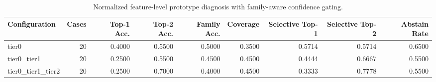 \begin{table}[t]
\centering
\caption{Normalized feature-level prototype diagnosis with family-aware confidence gating.}
\label{tab:dice_stressor_hierarchical_diagnosis}
\footnotesize
\begin{tabular}{lrrrrrrrr}
\toprule
Configuration & Cases & Top-1 Acc. & Top-2 Acc. & Family Acc. & Coverage & Selective Top-1 & Selective Top-2 & Abstain Rate \\
\midrule
tier0 & 20 & 0.4000 & 0.5500 & 0.5000 & 0.3500 & 0.5714 & 0.5714 & 0.6500 \\
tier0_tier1 & 20 & 0.2500 & 0.5500 & 0.4500 & 0.4500 & 0.4444 & 0.6667 & 0.5500 \\
tier0_tier1_tier2 & 20 & 0.2500 & 0.7000 & 0.4000 & 0.4500 & 0.3333 & 0.7778 & 0.5500 \\
\bottomrule
\end{tabular}

\end{table}
